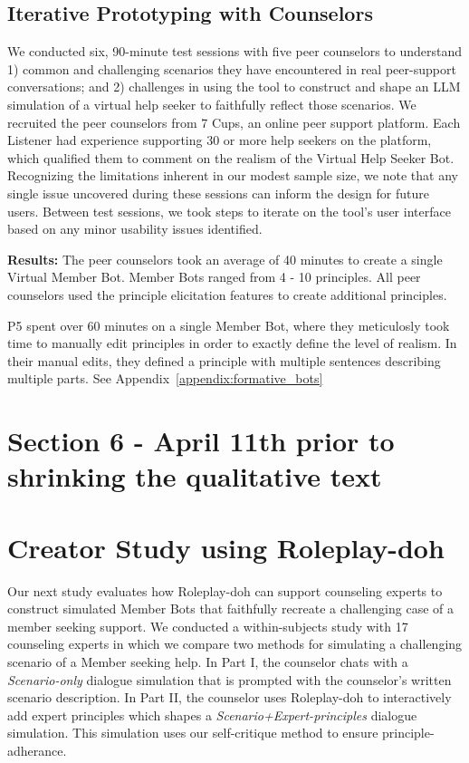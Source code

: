 \subsection{Iterative Prototyping with Counselors}
We conducted six, 90-minute test sessions with five peer counselors to understand 1) common and challenging scenarios they have encountered in real peer-support conversations; and 2) challenges in using the tool to construct and shape an LLM simulation of a virtual help seeker to faithfully reflect those scenarios. We recruited the peer counselors from 7 Cups, an online peer support platform. Each Listener had experience supporting 30 or more help seekers on the platform, which qualified them to comment on the realism of the Virtual Help Seeker Bot. Recognizing the limitations inherent in our modest sample size, we note that any single issue uncovered during these sessions can inform the design for future users. Between test sessions, we took steps to iterate on the tool's user interface based on any minor usability issues identified.

\textbf{Results:} The peer counselors took an average of 40 minutes to create a single Virtual Member Bot. Member Bots ranged from 4 - 10 principles. All peer counselors used the principle elicitation features to create additional principles.  

P5 spent over 60 minutes on a single Member Bot, where they meticulosly took time to manually edit principles in order to exactly define the level of realism. In their manual edits, they defined a principle with multiple sentences describing multiple parts. See Appendix~\ref{appendix:formative_bots}  


\section{Section 6 - April 11th prior to shrinking the qualitative text}
\section{Creator Study using Roleplay-doh}
Our next study evaluates how Roleplay-doh can support counseling experts to construct simulated Member Bots that faithfully recreate a challenging case of a member seeking support. We conducted a within-subjects study with 17 counseling experts in which we compare two methods for simulating a challenging scenario of a Member seeking help. In Part I, the counselor chats with a \emph{Scenario-only} dialogue simulation that is prompted with the counselor's written scenario description. In Part II, the counselor uses Roleplay-doh to interactively add expert principles which shapes a \emph{Scenario+Expert-principles} dialogue simulation. 
This simulation uses our self-critique method to ensure principle-adherance.

